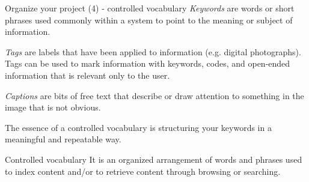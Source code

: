 \documentclass[10pt,aspectratio=169]{beamer} %
\begin{document}
\begin{frame}[t,label=frame12]{Organize your project (4) - controlled vocabulary}
\emph{Keywords} are words or short phrases used commonly within a system to point to the meaning or subject of information.

\emph{Tags} are labels that have been applied to information (e.g. digital photographs). 
Tags can be used to mark information with keywords, codes, and open-ended information that is relevant only to the user.

\emph{Captions} are bits of free text that describe or draw attention to something in the image that is not obvious.

The essence of a \alert{controlled vocabulary} is structuring your keywords in a meaningful and repeatable way.

\begin{alertblock}{Controlled vocabulary}
It is an organized arrangement of words and phrases used to index content and/or to retrieve content through
browsing or searching.
\end{alertblock}
\end{frame}
\end{document}
